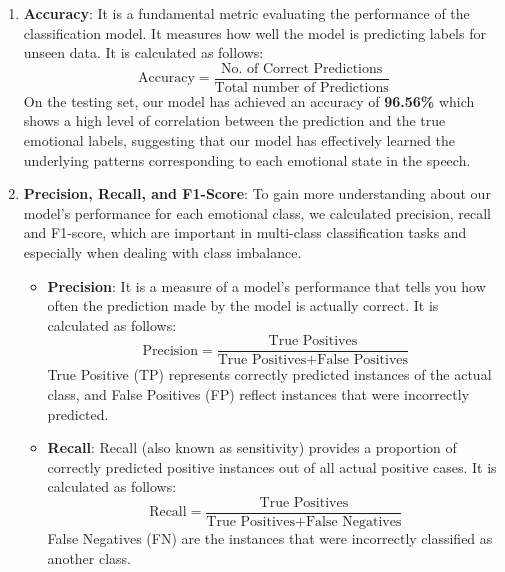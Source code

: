 \documentclass[iicol,sn-mathphys-num]{sn-jnl}%
\theoremstyle{thmstyleone}%
\theoremstyle{thmstyletwo}%
\theoremstyle{thmstylethree}%
\begin{document}
\begin{enumerate}
    \item \textbf{Accuracy}: It is a fundamental metric evaluating the performance of the classification model. It measures how well the model is predicting labels for unseen data. It is calculated as follows:
    \begin{equation}
    \text{Accuracy} = \frac{\text{No. of Correct Predictions}}{\text{Total number of Predictions}}
    \end{equation}
    On the testing set, our model has achieved an accuracy of \textbf{96.56\%} which shows a high level of correlation between the prediction and the true emotional labels, suggesting that our model has effectively learned the underlying patterns corresponding to each emotional state in the speech.\\
    
    \item \textbf{Precision, Recall, and F1-Score}: To gain more understanding about our model's performance for each emotional class, we calculated precision, recall and F1-score, which are important in multi-class classification tasks and especially when dealing with class imbalance.

    \begin{itemize}
        \item \textbf{Precision}: It is a measure of a model's performance that tells you how often the prediction made by the model is actually correct. It is calculated as follows:
        \begin{equation}
        \text{Precision} = \frac{\text{True Positives}}{\text{True Positives} + \text{False Positives}}
        \end{equation}
        True Positive (TP) represents correctly predicted instances of the actual class, and False Positives (FP) reflect instances that were incorrectly predicted.\\
        
        \item \textbf{Recall}: Recall (also known as sensitivity) provides a proportion of correctly predicted positive instances out of all actual positive cases. It is calculated as follows:
        \begin{equation}
        \text{Recall} = \frac{\text{True Positives}}{\text{True Positives} + \text{False Negatives}}
        \end{equation}
        False Negatives (FN) are the instances that were incorrectly classified as another class.\\
        

\end{itemize}
\end{enumerate}
\end{document}
